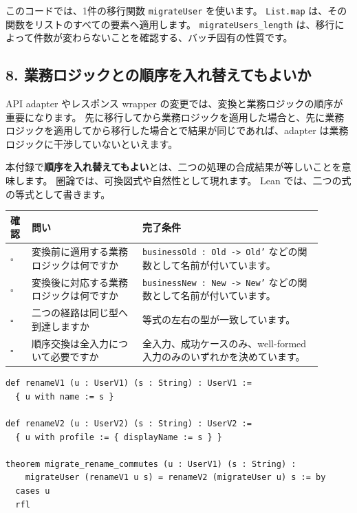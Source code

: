 このコードでは、1件の移行関数 \texttt{migrateUser} を使います。
\texttt{List.map} は、その関数をリストのすべての要素へ適用します。
\texttt{migrateUsers\_}\allowbreak\texttt{length} は、移行によって件数が変わらないことを確認する、バッチ固有の性質です。

\subsection{8. 業務ロジックとの順序を入れ替えてもよいか}

API adapter やレスポンス wrapper の変更では、変換と業務ロジックの順序が重要になります。
先に移行してから業務ロジックを適用した場合と、先に業務ロジックを適用してから移行した場合とで結果が同じであれば、adapter は業務ロジックに干渉していないといえます。

本付録で\textbf{順序を入れ替えてもよい}とは、二つの処理の合成結果が等しいことを意味します。
圏論では、可換図式や自然性として現れます。
Lean では、二つの式の等式として書きます。

\begin{longtable}{@{}p{0.06\linewidth}p{0.32\linewidth}p{0.52\linewidth}@{}}
\toprule
確認 & 問い & 完了条件 \\
\midrule
\endhead
\(\square\) & 変換前に適用する業務ロジックは何ですか & \texttt{businessOld : Old -> Old'} などの関数として名前が付いています。 \\
\(\square\) & 変換後に対応する業務ロジックは何ですか & \texttt{businessNew : New -> New'} などの関数として名前が付いています。 \\
\(\square\) & 二つの経路は同じ型へ到達しますか & 等式の左右の型が一致しています。 \\
\(\square\) & 順序交換は全入力について必要ですか & 全入力、成功ケースのみ、well-formed 入力のみのいずれかを決めています。 \\
\bottomrule
\end{longtable}

\clearpage

\begin{listing}[htbp]
\begin{verbatim}
def renameV1 (u : UserV1) (s : String) : UserV1 :=
  { u with name := s }

def renameV2 (u : UserV2) (s : String) : UserV2 :=
  { u with profile := { displayName := s } }

theorem migrate_rename_commutes (u : UserV1) (s : String) :
    migrateUser (renameV1 u s) = renameV2 (migrateUser u) s := by
  cases u
  rfl
\end{verbatim}
\caption{\texttt{migrate\_rename\_commutes}}
\label{lst:appD_commute_business}
\end{listing}

